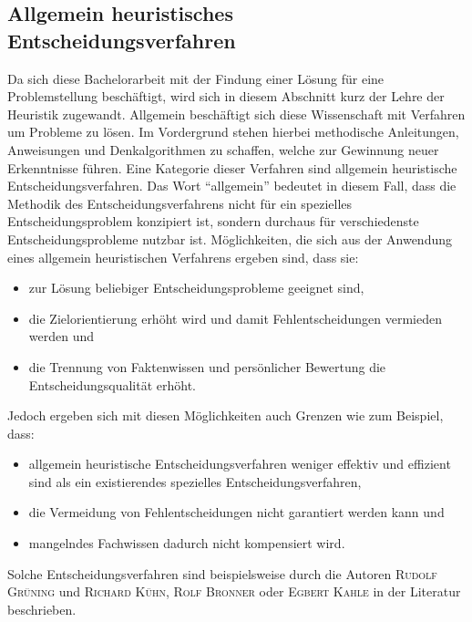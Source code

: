\subsection{Allgemein heuristisches Entscheidungsverfahren}
Da sich diese Bachelorarbeit mit der Findung einer Lösung für eine Problemstellung beschäftigt, wird sich in diesem Abschnitt kurz der Lehre der Heuristik zugewandt. Allgemein beschäftigt sich diese Wissenschaft mit Verfahren um Probleme zu lösen. Im Vordergrund stehen hierbei methodische Anleitungen, Anweisungen und Denkalgorithmen zu schaffen, welche zur Gewinnung neuer Erkenntnisse führen. \cite{Duden.10.02.2022} \linebreak Eine Kategorie dieser Verfahren sind allgemein heuristische Entscheidungsverfahren. Das Wort "`allgemein"' bedeutet in diesem Fall, dass die Methodik des Entscheidungsverfahrens nicht für ein spezielles Entscheidungsproblem konzipiert ist, sondern durchaus für verschiedenste Entscheidungsprobleme nutzbar ist. 
Möglichkeiten, die sich aus der Anwendung eines allgemein heuristischen Verfahrens ergeben sind, dass sie:
\begin{itemize}
	\item zur Lösung beliebiger Entscheidungsprobleme geeignet sind,
	\item die Zielorientierung erhöht wird und damit Fehlentscheidungen vermieden werden und
	\item die Trennung von Faktenwissen und persönlicher Bewertung die Entscheidungsqualität erhöht.
\end{itemize}
Jedoch ergeben sich mit diesen Möglichkeiten auch Grenzen wie zum Beispiel, dass:
\begin{itemize}
	\item allgemein heuristische Entscheidungsverfahren weniger effektiv und effizient sind als ein existierendes spezielles Entscheidungsverfahren,
	\item die Vermeidung von Fehlentscheidungen nicht garantiert werden kann und
	\item mangelndes Fachwissen dadurch nicht kompensiert wird.
\end{itemize}
Solche Entscheidungsverfahren sind beispielsweise durch die Autoren \textsc{Rudolf Grüning} und \textsc{Richard Kühn}, \textsc{Rolf Bronner} oder \textsc{Egbert Kahle} in der Literatur beschrieben.


%
%
%
%
%
